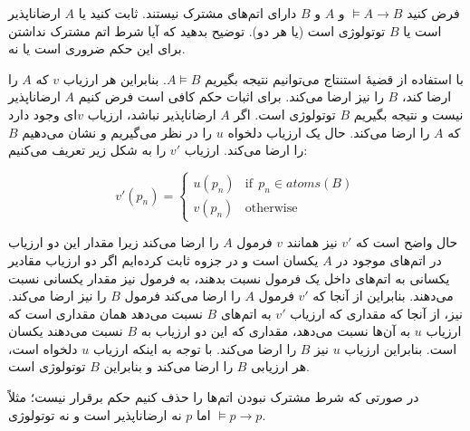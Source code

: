 فرض کنید $\models A\rightarrow B$ و $A$ و $B$ دارای اتم‌های مشترک نیستند. ثابت کنید یا $A$ ارضاناپذیر است یا $B$ توتولوژی است (یا هر دو). توضیح بدهید که آیا شرط اتم مشترک نداشتن برای این حکم ضروری است یا نه.
\begin{ans}
  با استفاده از قضیهٔ استنتاج می‌توانیم نتیجه بگیریم $A\models B$. بنابراین هر ارزیاب $v$ که $A$ را ارضا کند، $B$ را نیز ارضا می‌کند. برای اثبات حکم کافی است فرض کنیم $A$ ارضاناپذیر نیست و نتیجه بگیریم $B$ توتولوژی است. اگر $A$ ارضاناپذیر نباشد، ارزیاب $v$ای وجود دارد که $A$ را ارضا می‌کند. حال یک ارزیاب دلخواه $u$ را در نظر می‌گیریم و نشان می‌دهیم $B$ را ارضا می‌کند. ارزیاب $v'$ را به شکل زیر تعریف می‌کنیم:

  $$
  v'(p_n)=
  \begin{cases}
  u(p_n) & \text{if}~~p_n\in atoms(B) \\
  v(p_n) & \text{otherwise}
  \end{cases}
  $$

  حال واضح است که $v'$ نیز همانند $v$ فرمول $A$ را ارضا می‌کند زیرا مقدار این دو ارزیاب در اتم‌های موجود در $A$ یکسان است و در جزوه ثابت کرده‌ایم اگر دو ارزیاب مقادیر یکسانی به اتم‌های داخل یک فرمول نسبت بدهند، به فرمول نیز مقدار یکسانی نسبت می‌دهند. بنابراین از آنجا که $v'$ فرمول $A$ را ارضا می‌کند فرمول $B$ را نیز ارضا می‌کند. نیز، از آنجا که مقداری که ارزیاب $v'$ به اتم‌های $B$ نسبت می‌دهد همان مقداری است که ارزیاب $u$ به آن‌ها نسبت می‌دهد، مقداری که این دو ارزیاب به $B$ نسبت می‌دهند یکسان است. بنابراین ارزیاب $u$ نیز $B$ را ارضا می‌کند. با توجه به اینکه ارزیاب $u$ دلخواه است، هر ارزیابی $B$ را ارضا می‌کند و بنابراین $B$ توتولوژی است.

  در صورتی که شرط مشترک نبودن اتم‌ها را حذف کنیم حکم برقرار نیست؛ مثلاً
  $\models p\rightarrow p$
  اما $p$ نه ارضاناپذیر است و نه توتولوژی.
\end{ans}
